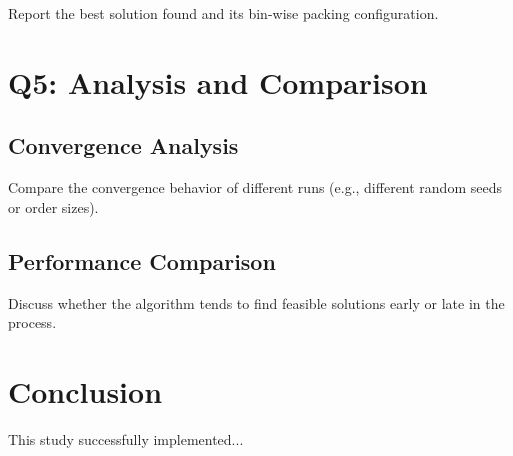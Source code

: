 \documentclass[journal,12pt,onecolumn]{IEEEtran}
\begin{document}
Report the best solution found and its bin-wise packing configuration.

\section{Q5: Analysis and Comparison}

\subsection{Convergence Analysis}

Compare the convergence behavior of different runs (e.g., different random seeds or order sizes).

\subsection{Performance Comparison}

Discuss whether the algorithm tends to find feasible solutions early or late in the process.

\section{Conclusion}
This study successfully implemented...
\end{document}
